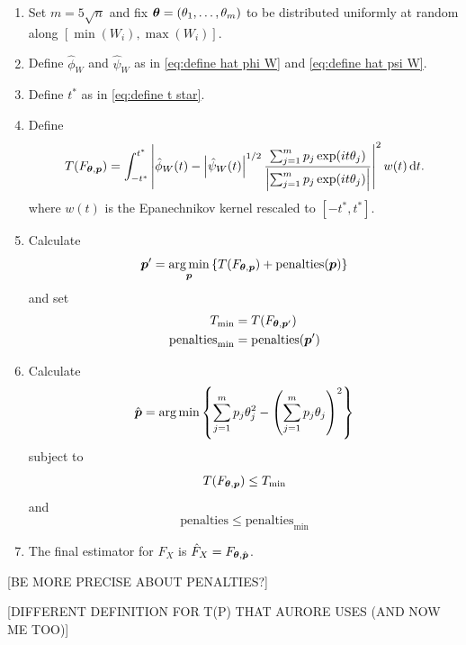 	\begin{enumerate}
		\item Set $m = 5\sqrt{n}$ and fix ${\bm{{\theta}}} = (\theta_1, \dots, \theta_m)$ to be distributed uniformly at random along $[\min(W_i), \max(W_i)]$.
		\item Define $\hat{\phi}_W$ and $\hat{\psi}_W$ as in \eqref{eq:define hat phi W} and \eqref{eq:define hat psi W}.
		\item Define $t^*$ as in \eqref{eq:define t star}.
		\item Define
		\begin{equation}
			T(F_{{\bm{{\theta}}}, {\bm{{p}}}}) = \int_{-t^*}^{t^*} \left| \hat{\phi}_W(t) - \left|\hat{\psi}_W(t)\right|^{1/2} \frac{ \sum_{j = 1}^m p_j \exp(it\theta_j)}{\left| \sum_{j = 1}^m p_j \exp(it\theta_j)\right|} \right|^2 w(t) \, \mathrm{d} t.
		\end{equation}
		where $w(t)$ is the Epanechnikov kernel rescaled to $[-t^*, t^*]$.
		\item
		Calculate
		\begin{equation}
			 {\bm{{p}}}' = \operatorname*{arg\,min}_{{\bm{{p}}}} \left\{T(F_{{\bm{{\theta}}}, {\bm{{p}}}}) + \mathrm{penalties}({\bm{{p}}})\right\}
		\end{equation}
		and set
		\begin{align}
			T_\mathrm{min} &= T(F_{{\bm{{\theta}}}, {\bm{{p}}}'})\\
			\mathrm{penalties}_\mathrm{min} &= \mathrm{penalties}({\bm{{p}}}')
		\end{align}
		\item Calculate
		\begin{equation}
			\hat{{\bm{{p}}}} = \operatorname*{arg\,min} \left\{ \sum_{j = 1}^m p_j \theta_j^2 - \left( \sum_{j=1}^m p_j \theta_j \right)^2 \right\}
		\end{equation}
		subject to
		\begin{equation}
			T(F_{{\bm{{\theta}}}, {\bm{{p}}}}) \leq T_\mathrm{min}
		\end{equation}
		and 
		\begin{equation}
			\mathrm{penalties} \leq \mathrm{penalties}_\mathrm{min}
		\end{equation}
		\item The final estimator for $F_X$ is $\hat{F}_X = F_{{\bm{{\theta}}}, \hat{{\bm{{p}}}}}$.
	\end{enumerate}
	[BE MORE PRECISE ABOUT PENALTIES?]


	[DIFFERENT DEFINITION FOR T(P) THAT AURORE USES (AND NOW ME TOO)]

